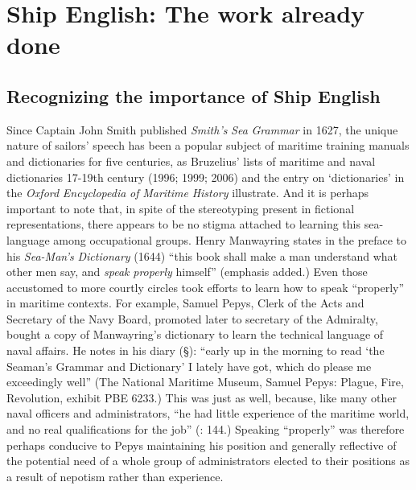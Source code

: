 \section{\textbf{Ship} \textbf{English:} \textbf{The} \textbf{work} \textbf{already} \textbf{done}}%

\subsection{\textbf{Recognizing} \textbf{the} \textbf{importance} \textbf{of} \textbf{Ship} \textbf{English}}%

Since Captain John Smith published \textit{Smith’s} \textit{Sea} \textit{Grammar} in 1627, the unique nature of sailors’ speech has been a popular subject of maritime training manuals and dictionaries for five centuries, as Bruzelius’ lists of maritime and naval dictionaries 17-19th century (1996; 1999; 2006) and the entry on ‘dictionaries’ in the \textit{Oxford} \textit{Encyclopedia} \textit{of} \textit{Maritime} \textit{History} \citep{Hattendorf2007} illustrate. And it is perhaps important to note that, in spite of the stereotyping present in fictional representations, there appears to be no stigma attached to learning this sea-language among occupational groups. Henry Manwayring states in the preface to his \textit{Sea-Man’s} \textit{Dictionary} (1644) “this book shall make a man understand what other men say, and \textit{speak} \textit{properly} himself” (emphasis added.) Even those accustomed to more courtly circles took efforts to learn how to speak “properly” in maritime contexts. For example, Samuel Pepys, Clerk of the Acts and Secretary of the Navy Board, promoted later to secretary of the Admiralty, bought a copy of Manwayring’s dictionary to learn the technical language of naval affairs. He notes in his diary (§\citealt{March1661}): “early up in the morning to read ‘the Seaman’s Grammar and Dictionary’ I lately have got, which do please me exceedingly well” (The National Maritime Museum, Samuel Pepys: Plague, Fire, Revolution, exhibit PBE 6233.)  This was just as well, because, like many other naval officers and administrators, “he had little experience of the maritime world, and no real qualifications for the job” (\citealt{Lincoln2015}: 144.) Speaking “properly” was therefore perhaps conducive to Pepys maintaining his position and generally reflective of the potential need of a whole group of administrators elected to their positions as a result of nepotism rather than experience. 

